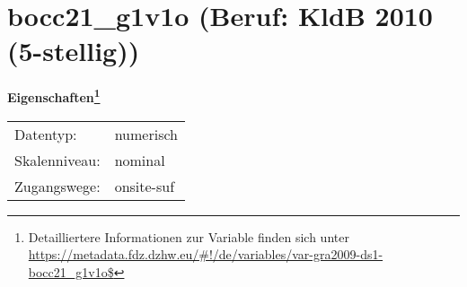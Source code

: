 
    \setcounter{footnote}{0}

    \vspace*{-1.8cm}
	\section{bocc21\_g1v1o (Beruf: KldB 2010 (5-stellig))}
	\label{section:bocc21_g1v1o}



    \vspace*{0.5cm}
    \noindent\textbf{Eigenschaften\footnote{Detailliertere Informationen zur Variable finden sich unter
		\url{https://metadata.fdz.dzhw.eu/\#!/de/variables/var-gra2009-ds1-bocc21_g1v1o$}}}\\
	\begin{tabularx}{\hsize}{@{}lX}
	Datentyp: & numerisch \\
	Skalenniveau: & nominal \\
	Zugangswege: &
	  onsite-suf
 \\
    \end{tabularx}



